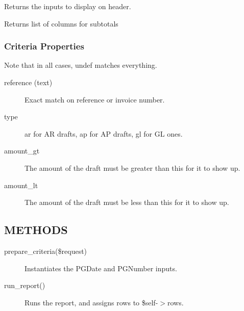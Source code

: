\begin{description}
\begin{description}
\begin{description}
\begin{description}
\begin{description}
\begin{description}
\begin{description}
\begin{description}
\begin{description}
\begin{description}
\begin{description}
Returns the inputs to display on header.


\item[{subtotal\_cols}] \mbox{}

Returns list of columns for subtotals

\end{description}
\subsubsection*{Criteria Properties\label{LedgerSMB::DBObject::Report::Unapproved::Batch_Overview_Criteria_Properties}}


Note that in all cases, undef matches everything.

\begin{description}

\item[{reference (text)}] \mbox{}

Exact match on reference or invoice number.


\item[{type}] \mbox{}

ar for AR drafts, ap for AP drafts, gl for GL ones.


\item[{amount\_gt}] \mbox{}

The amount of the draft must be greater than this for it to show up.


\item[{amount\_lt}] \mbox{}

The amount of the draft must be less than this for it to show up.

\end{description}
\subsection*{METHODS\label{LedgerSMB::DBObject::Report::Unapproved::Batch_Overview_METHODS}}
\begin{description}

\item[{prepare\_criteria(\$request)}] \mbox{}

Instantiates the PGDate and PGNumber inputs.


\item[{run\_report()}] \mbox{}

Runs the report, and assigns rows to \$self-$>$rows.


\end{description}
\end{description}
\end{description}
\end{description}
\end{description}
\end{description}
\end{description}
\end{description}
\end{description}
\end{description}
\end{description}
